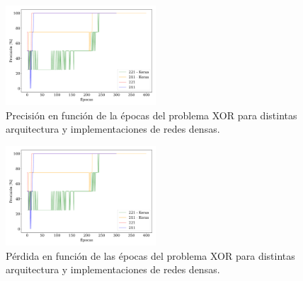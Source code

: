 
    \begin{figure}[H]
        \begin{small}
            \begin{center}
                \includegraphics[width=0.5\textwidth]{Graphs/ejer2_6_acc.pdf}
            \end{center}
            \caption{Precisión en función de la épocas del problema XOR para distintas arquitectura y implementaciones de redes densas.}
            \label{fig:ejer2-6-acc}
        \end{small}
    \end{figure}

    \begin{figure}[H]
        \begin{small}
            \begin{center}
                \includegraphics[width=0.5\textwidth]{Graphs/ejer2_6_acc.pdf}
            \end{center}
            \caption{Pérdida en  función de las épocas del problema XOR para distintas arquitectura y implementaciones de redes densas.}
            \label{fig:ejer2-6-los}
        \end{small}
    \end{figure}



